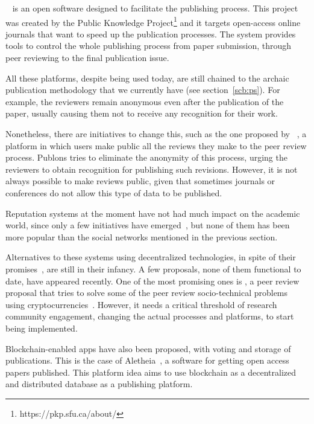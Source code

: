 ~\cite{willinsky2005open} is an open software designed
to facilitate the publishing process. This project was created by the Public
Knowledge Project\footnote{https://pkp.sfu.ca/about/} and it targets open-access
online journals that want to speed up the publication processes. The system
provides tools to control the whole publishing process from paper submission,
through peer reviewing to the final publication issue.

All these platforms, despite being used today, are still chained to the archaic
publication methodology that we currently have (see section~\ref{scb:ps}). For
example, the reviewers remain anonymous even after the publication of the paper,
usually causing them not to receive any recognition for their work.

Nonetheless, there are initiatives to change this, such as the one proposed by
~\cite{rajpert2016rewarding}, a platform in which users make public
all the reviews they make to the peer review process. Publons tries to eliminate
the anonymity of this process, urging the reviewers to obtain recognition for
publishing such revisions. However, it is not always possible to make reviews
public, given that sometimes journals or conferences do not allow this type of
data to be published.

Reputation systems at the moment have not had much impact on the academic world,
since only a few initiatives have emerged~\cite{sabaterpeer}, but none of them
has been more popular than the social networks mentioned in the previous
section.

Alternatives to these systems using decentralized technologies, in spite of
their promises~\cite{bartlingblockchain}, are still in their infancy. A few
proposals, none of them functional to date, have appeared recently. One of the
most promising ones is , a peer review proposal that tries to solve
some of the peer review socio-technical problems using
cryptocurrencies~\cite{tennant2017multi}. However, it needs a critical threshold
of research community engagement, changing the actual processes and platforms,
to start being implemented.

Blockchain-enabled apps have also been proposed, with voting and storage of
publications. This is the case of Aletheia~\cite{morton2017aletheia}, a software
for getting open access papers published. This platform idea aims to use
blockchain as a decentralized and distributed database as a publishing platform.

